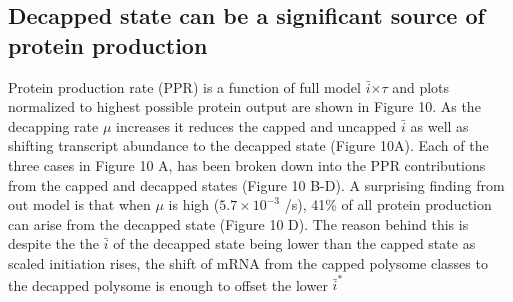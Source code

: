 \documentclass[a4,center,fleqn,nocrop]{NAR}
\newcommand{\imax}{\ensuremath{{i_{\max}}}\xspace}
\newcommand{\MRL}{\ensuremath{\bar{i}}\xspace}
\begin{document}
\subsection{Decapped state can be a significant source of protein production} %
Protein production rate (PPR) is a function of full model \MRL $\times \tau$ and plots normalized to highest possible protein output are shown in Figure 10.
As the decapping rate $\mu$ increases it reduces the capped and uncapped \MRL as well as shifting transcript abundance to the decapped state (Figure 10A).
Each of the three cases in Figure 10 A, has been broken down into the PPR contributions from the capped and decapped states (Figure 10 B-D). 
A surprising finding from out model is that when $\mu$ is high ($5.7\times 10^{-3}$ /s), 41\% of all protein production can arise from the decapped state (Figure 10 D).
The reason behind this is despite the the \MRL of the decapped state being lower than the capped state as scaled initiation rises, the shift of mRNA from the capped polysome classes to the decapped polysome is enough to offset the lower $\MRL^*$
\end{document}
